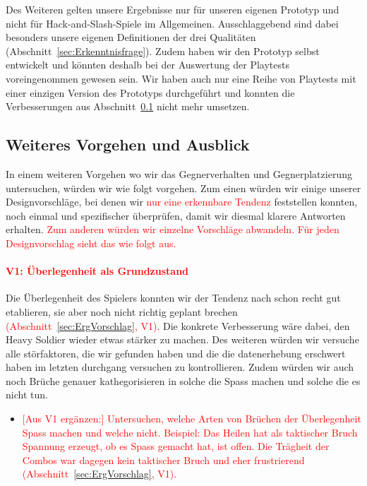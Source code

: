 \documentclass[../Main.tex]{subfiles}
\begin{document}
Des Weiteren gelten unsere Ergebnisse nur für unseren eigenen Prototyp und nicht für Hack-and-Slash-Spiele im Allgemeinen. Ausschlaggebend sind dabei besonders unsere eigenen Definitionen der drei Qualitäten (Abschnitt~\ref{sec:Erkenntnisfrage}). Zudem haben wir den Prototyp selbst entwickelt und könnten deshalb bei der Auswertung der Playtests voreingenommen gewesen sein. Wir haben auch nur eine Reihe von Playtests mit einer einzigen Version des Prototyps durchgeführt und konnten die Verbesserungen aus Abschnitt~\ref{sec:Verbesserungen} nicht mehr umsetzen.

\subsection{Weiteres Vorgehen und Ausblick} \label{sec:Verbesserungen}

In einem weiteren Vorgehen wo wir das Gegnerverhalten und Gegnerplatzierung untersuchen, würden wir wie folgt vorgehen. Zum einen würden wir einige unserer Designvorschläge, bei denen wir \textcolor{red}{nur eine erkennbare Tendenz} feststellen konnten, noch einmal und spezifischer überprüfen, damit wir diesmal klarere Antworten erhalten. \textcolor{red}{Zum anderen würden wir einzelne Vorschläge abwandeln. Für jeden Designvorschlag sieht das wie folgt aus.}

\paragraph{\textcolor{red}{V1: Überlegenheit als Grundzustand}}
Die Überlegenheit des Spielers konnten wir der Tendenz nach schon recht gut etablieren, sie aber noch nicht richtig geplant brechen \textcolor{red}{(Abschnitt~\ref{sec:ErgVorschlag}, V1)}. Die konkrete Verbesserung wäre dabei, den Heavy Soldier wieder etwas stärker zu machen. Des weiteren würden wir versuche alle störfaktoren, die wir gefunden haben und die die datenerhebung erschwert haben im letzten durchgang versuchen zu kontrollieren. Zudem würden wir auch noch Brüche genauer kathegorisieren in solche die Spass machen und solche die es nicht tun.

\begin{itemize}[leftmargin=1.5cm]
    \item \textcolor{red}{[Aus V1 ergänzen:] Untersuchen, welche Arten von Brüchen der Überlegenheit Spass machen und welche nicht. Beispiel: Das Heilen hat als taktischer Bruch Spannung erzeugt, ob es Spass gemacht hat, ist offen. Die Trägheit der Combos war dagegen kein taktischer Bruch und eher frustrierend (Abschnitt~\ref{sec:ErgVorschlag}, V1).}
\end{itemize}
\end{document}
